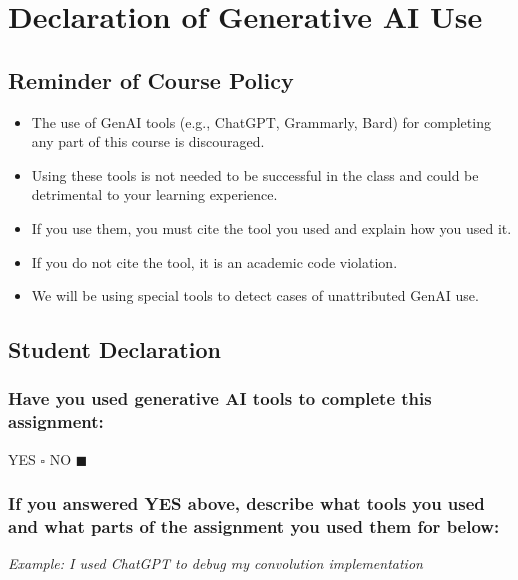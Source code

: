 \pagebreak

\section*{Declaration of Generative AI Use}

\subsection*{Reminder of Course Policy}

\begin{itemize}
    \item The use of GenAI tools (e.g., ChatGPT, Grammarly, Bard) for completing any part of this course is discouraged.
    \item Using these tools is not needed to be successful in the class and could be detrimental to your learning experience.
    \item If you use them, you must cite the tool you used and explain how you used it.
    \item If you do not cite the tool, it is an academic code violation.
    \item We will be using special tools to detect cases of unattributed GenAI use.
\end{itemize}

\subsection*{Student Declaration}

\subsubsection*{Have you used generative AI tools to complete this assignment:}


YES $\square$ NO $\blacksquare$ %


\subsubsection*{If you answered YES above, describe what tools you used and what parts of the assignment you used them for below:}


\textit{Example: I used ChatGPT to debug my convolution implementation}

